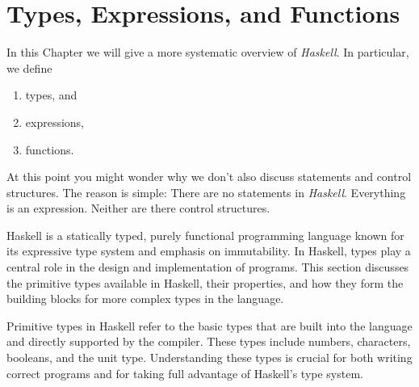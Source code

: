 \chapter{Types, Expressions, and Functions}
In this Chapter we will give a more systematic overview of \textsl{Haskell}.  In particular, we define
\begin{enumerate}
\item types, and
\item expressions,
\item functions.
\end{enumerate}
At this point you might wonder why we don't also discuss statements and control structures.  The reason is
simple:  There are no statements in \textsl{Haskell}. Everything is an expression.  Neither are there control
structures. 

Haskell is a statically typed, purely functional programming language known for its expressive type system and emphasis on immutability. In Haskell, types play a central role in the design and implementation of programs. This section discusses the primitive types available in Haskell, their properties, and how they form the building blocks for more complex types in the language.

Primitive types in Haskell refer to the basic types that are built into the language and directly supported by the compiler. These types include numbers, characters, booleans, and the unit type. Understanding these types is crucial for both writing correct programs and for taking full advantage of Haskell's type system.

